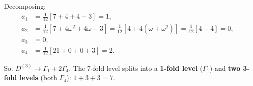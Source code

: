 \documentclass[12pt]{article}
\begin{document}
Decomposing:
\begin{align*}
a_1 &= \frac{1}{12}[7 + 4 + 4 - 3] = 1, \\
a_2 &= \frac{1}{12}[7 + 4\omega^2 + 4\omega - 3] = \frac{1}{12}[4 + 4(\omega + \omega^2)] = \frac{1}{12}[4 - 4] = 0, \\
a_3 &= 0, \\
a_4 &= \frac{1}{12}[21 + 0 + 0 + 3] = 2.
\end{align*}

So: $D^{(3)} \to \Gamma_1 + 2\Gamma_4$. The 7-fold level splits into a \textbf{1-fold level} ($\Gamma_1$) and \textbf{two 3-fold levels} (both $\Gamma_4$): $1 + 3 + 3 = 7$.
\end{document}
